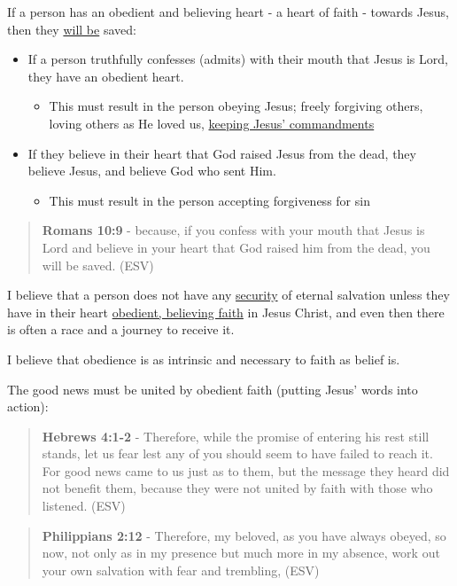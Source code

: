 \documentclass[11pt]{article}
\begin{document}
If a person has an obedient and believing heart - a heart of faith - towards Jesus, then they \uline{will be} saved:
\begin{itemize}
\item If a person truthfully confesses (admits) with their mouth that Jesus is Lord, they have an obedient heart.
\begin{itemize}
\item This must result in the person obeying Jesus; freely forgiving others, loving others as He loved us, \uline{keeping Jesus' commandments}
\end{itemize}
\item If they believe in their heart that God raised Jesus from the dead, they believe Jesus, and believe God who sent Him.
\begin{itemize}
\item This must result in the person accepting forgiveness for sin
\end{itemize}
\end{itemize}

\begin{quote}
\textbf{Romans 10:9} - because, if you confess with your mouth that Jesus is Lord and believe in your heart that God raised him from the dead, you will be saved. (ESV)
\end{quote}

I believe that a person does not have any \uline{security} of eternal salvation unless they have in their heart \uline{obedient, believing faith} in Jesus Christ, and even then there is often a race and a journey to receive it.

I believe that obedience is as intrinsic and necessary to faith as belief is.

The good news must be united by obedient faith (putting Jesus' words into action):

\begin{quote}
\textbf{Hebrews 4:1-2} - Therefore, while the promise of entering his rest still stands, let us fear lest any of you should seem to have failed to reach it. For good news came to us just as to them, but the message they heard did not benefit them, because they were not united by faith with those who listened. (ESV)
\end{quote}

\begin{quote}
\textbf{Philippians 2:12} - Therefore, my beloved, as you have always obeyed, so now, not only as in my presence but much more in my absence, work out your own salvation with fear and trembling, (ESV)
\end{quote}
\end{document}
